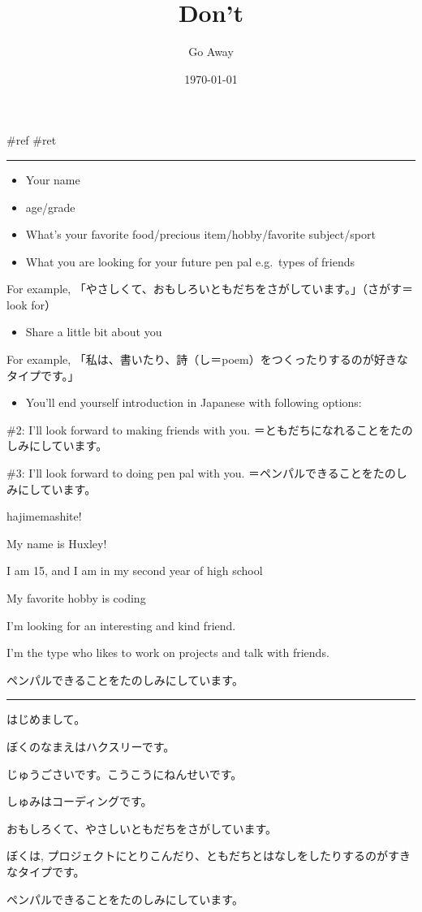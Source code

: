 \documentclass[letterpaper]{article}
\author{Go Away}
\date{\today}
\title{Don't}
\renewcommand\maketitle{}
\begin{document}
\maketitle
\#ref \#ret

\noindent\rule{\textwidth}{0.5pt}

\begin{itemize}
\item Your name

\item age/grade

\item What's your favorite food/precious item/hobby/favorite subject/sport

\item What you are looking for your future pen pal e.g. types of friends
\end{itemize}

For example,
「やさしくて、おもしろいともだちをさがしています。」（さがす＝look for）

\begin{itemize}
\item Share a little bit about you
\end{itemize}

For example,
「私は、書いたり、詩（し＝poem）をつくったりするのが好きなタイプです。」

\begin{itemize}
\item You'll end yourself introduction in Japanese with following options:
\end{itemize}

\#2: I'll look forward to making friends with you.
＝ともだちになれることをたのしみにしています。

\#3: I'll look forward to doing pen pal with you.
＝ペンパルできることをたのしみにしています。

hajimemashite!

My name is Huxley!

I am 15, and I am in my second year of high school

My favorite hobby is coding

I'm looking for an interesting and kind friend.

I'm the type who likes to work on projects and talk with friends.

ペンパルできることをたのしみにしています。

\noindent\rule{\textwidth}{0.5pt}

はじめまして。

ぼくのなまえはハクスリーです。

じゅうごさいです。こうこうにねんせいです。

しゅみはコーディングです。

おもしろくて、やさしいともだちをさがしています。

ぼくは,
プロジェクトにとりこんだり、ともだちとはなしをしたりするのがすきなタイプです。

ペンパルできることをたのしみにしています。
\end{document}
